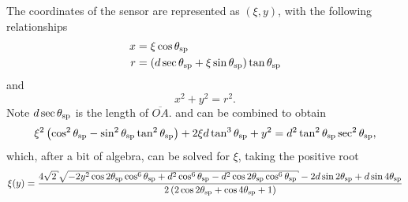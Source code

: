 The coordinates of the sensor are represented as $(\xi,y)$, with the 
following relationships
\begin{align}
x &= \xi \cos \theta_\mathrm{sp} \label{eqn:conic01a} \\
r &= \left(d \sec \theta_\mathrm{sp} + \xi \sin \theta_\mathrm{sp}\right) \tan\theta_\mathrm{sp} \label{eqn:conic01b}
\end{align}
and
\begin{equation}
x^2+y^2=r^2.
\label{eqn:conic01c}
\end{equation}
Note $d \sec\theta_\mathrm{sp}$ is the length of $\overline{OA}$.
 and  can be combined to obtain
\begin{equation}
\xi^2 \left(\cos ^2\theta_\mathrm{sp}-\sin ^2\theta_\mathrm{sp} \tan
^2\theta_\mathrm{sp}\right)+2 \xi d \tan ^3\theta_\mathrm{sp}+y^2=d^2 \tan
^2\theta_\mathrm{sp} \sec ^2\theta_\mathrm{sp},
\end{equation}
which, after a bit of algebra, can be solved for $\xi$, taking
the positive root
\begin{equation}
\xi(y) = \frac{4 \sqrt{2} \sqrt{-2 y^2 \cos 2 \thetasp  \cos ^6\thetasp +d^2
\cos ^6\thetasp -d^2 \cos 2 \thetasp  \cos^6\thetasp}-2 d \sin 2 \thetasp
+d \sin 4 \thetasp }{2 \left(2 \cos 2 \thetasp +\cos 4 \thetasp +1\right)}
\label{eqn:conic02}
\end{equation}

